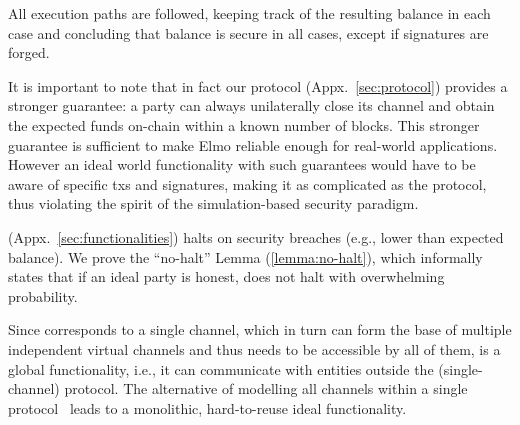 \begin{proofsketch}
  All execution paths are followed, keeping track of the
  resulting balance in each case and concluding that balance is
  secure in all cases, except if signatures are forged.
\end{proofsketch}
    It is important to note that in fact our protocol \pchan (Appx.~\ref{sec:protocol}) provides a stronger guarantee:
  a party can always unilaterally close its channel
  and obtain the expected funds on-chain within a known number of blocks.
  This stronger guarantee is sufficient to make Elmo reliable
  enough for real-world applications. However an ideal world
  functionality with such guarantees would have to be aware of specific
  txs and signatures, making it as complicated
  as the protocol, thus violating the spirit of the simulation-based security
  paradigm.

  \fchan (Appx.~\ref{sec:functionalities}) halts on security breaches (e.g., lower
  than expected balance).
  We prove the ``no-halt'' Lemma (\ref{lemma:no-halt}), which informally states
  that if an ideal party is honest, \fchan does not halt with overwhelming
  probability.

  Since \fchan corresponds to a single channel, which in turn can form the base
  of multiple independent virtual channels and thus needs to be accessible by
  all of them, \fchan is a global functionality, i.e., it can communicate with
  entities outside the (single-channel) protocol. The alternative of modelling
  all channels within a single protocol~\cite{DBLP:conf/csfw/KiayiasL20} leads
  to a monolithic, hard-to-reuse ideal functionality.

